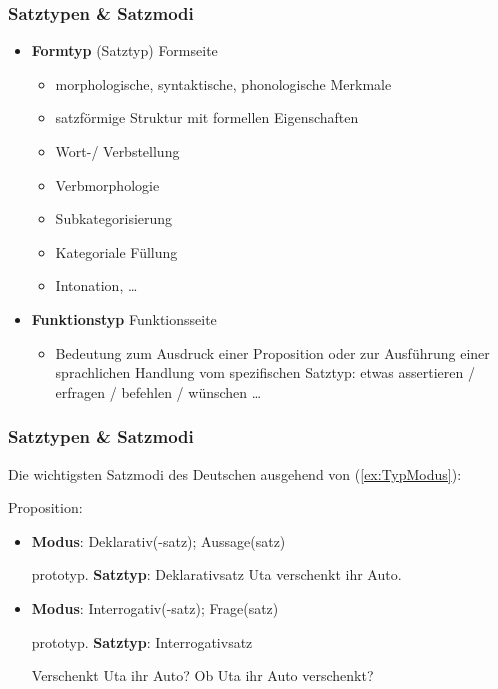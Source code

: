 \begin{frame}
\frametitle{Satztypen \& Satzmodi}

\begin{itemize}
	\item \textbf{Formtyp} (Satztyp) \ras Formseite
	\begin{itemize}
		\item morphologische, syntaktische, phonologische Merkmale
		\item satzförmige Struktur mit formellen Eigenschaften
		\item Wort-/ Verbstellung
		\item Verbmorphologie
		\item Subkategorisierung
		\item Kategoriale Füllung
		\item Intonation, \dots
	\end{itemize}

	\item \textbf{Funktionstyp} \ras Funktionsseite
	\begin{itemize}
		\item Bedeutung zum Ausdruck einer Proposition oder zur Ausführung einer sprachlichen Handlung vom spezifischen Satztyp: etwas assertieren / erfragen / befehlen / wünschen \dots\ 
	\end{itemize}
\end{itemize}

\end{frame}


\begin{frame}
\frametitle{Satztypen \& Satzmodi}

Die wichtigsten Satzmodi des Deutschen ausgehend von (\ref{ex:TypModus}):

\ea\label{ex:TypModus} Proposition: 
\z

\pause 

\begin{itemize}
	\item \textbf{Modus}: Deklarativ(-satz); Aussage(satz) 
	
	prototyp. \textbf{Satztyp}: Deklarativsatz
	\ea Uta verschenkt ihr Auto.
	\z

\pause 
	
	\item \textbf{Modus}: Interrogativ(-satz); Frage(satz)
	
	prototyp. \textbf{Satztyp}: Interrogativsatz
	
	\ea Verschenkt Uta ihr Auto?
	\ex Ob Uta ihr Auto verschenkt?
	\z
\end{itemize}

\end{frame}


